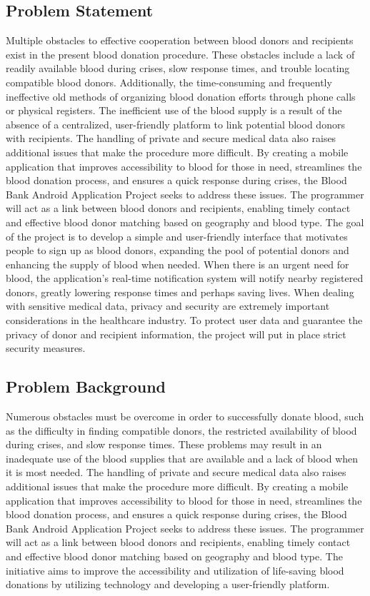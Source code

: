 \subsection{Problem Statement}
Multiple obstacles to effective cooperation between blood donors and recipients exist in the present
blood donation procedure. These obstacles include a lack of readily available blood during crises, slow
response times, and trouble locating compatible blood donors. Additionally, the time-consuming and
frequently ineffective old methods of organizing blood donation efforts through phone calls or physical
registers. The inefficient use of the blood supply is a result of the absence of a centralized, user-friendly
platform to link potential blood donors with recipients. The handling of private and secure medical data
also raises additional issues that make the procedure more difficult. By creating a mobile application that
improves accessibility to blood for those in need, streamlines the blood donation process, and ensures a 
quick response during crises, the Blood Bank Android Application Project seeks to address these issues.
The programmer will act as a link between blood donors and recipients, enabling timely contact and
effective blood donor matching based on geography and blood type. The goal of the project is to develop
a simple and user-friendly interface that motivates people to sign up as blood donors, expanding the pool
of potential donors and enhancing the supply of blood when needed. When there is an urgent need for
blood, the application's real-time notification system will notify nearby registered donors, greatly
lowering response times and perhaps saving lives. When dealing with sensitive medical data, privacy and
security are extremely important considerations in the healthcare industry. To protect user data and
guarantee the privacy of donor and recipient information, the project will put in place strict security
measures.
\subsection{Problem Background}
Numerous obstacles must be overcome in order to successfully donate blood, such as the difficulty in
finding compatible donors, the restricted availability of blood during crises, and slow response times.
These problems may result in an inadequate use of the blood supplies that are available and a lack of
blood when it is most needed. The handling of private and secure medical data also raises additional issues
that make the procedure more difficult. By creating a mobile application that improves accessibility to
blood for those in need, streamlines the blood donation process, and ensures a quick response during
crises, the Blood Bank Android Application Project seeks to address these issues. The programmer will act
as a link between blood donors and recipients, enabling timely contact and effective blood donor
matching based on geography and blood type. The initiative aims to improve the accessibility and
utilization of life-saving blood donations by utilizing technology and developing a user-friendly platform.
